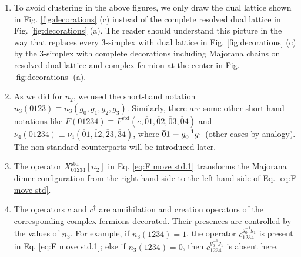 \documentclass[%
 reprint,
 amsmath,amssymb,
 aps,
prb,
]{revtex4-2}
\begin{document}
\begin{enumerate}
\item To avoid clustering in the above figures, we only draw the dual lattice shown in Fig. \ref{fig:decorations} (c) instead of the complete resolved dual lattice in Fig. \ref{fig:decorations} (a).
The reader should understand this picture in the way that replaces every 3-simplex with dual lattice in Fig. \ref{fig:decorations} (c) by the 3-simplex with complete decorations including Majorana chains on resolved dual lattice and complex fermion at the center in Fig. \ref{fig:decorations} (a).
\item As we did for $n_2$, we used the short-hand notation $n_{3} (0123) \equiv n_{3} (g_0, g_1, g_2, g_3)$.
Similarly, there are some other short-hand notations like $F(01234) \equiv F^{\mathrm{std}}( e,\overline{0} 1,\overline{0} 2,\overline{0} 3,\overline{0} 4)$ and $\nu_4(01234) \equiv \nu _{4}(\overline{0} 1,\overline{1} 2,\overline{2} 3,\overline{3} 4)$, where $\Bar{0}1 \equiv g_0^{-1} g_1$ (other cases by analogy).
The non-standard counterparts will be introduced later.
\item The operator $X_{01234}^{\mathrm{std}}[ n_{2}]$ in Eq. \eqref{eq:F move std.1} transforms the Majorana dimer configuration from the right-hand side to the left-hand side of Eq. \eqref{eq:F move std}.
\item The operators $c$ and $c^\dagger$ are annihilation and creation operators of the corresponding complex fermions decorated.
Their presences are controlled by the values of $n_3$.
For example, if $n_3(1234)=1$, the operator $c_{1234}^{g_{0}^{-1} g_{1}}$ is present in Eq. \eqref{eq:F move std.1}; else if $n_3(1234)=0$, then $c_{1234}^{g_{0}^{-1} g_{1}}$ is absent here.
\end{enumerate}
\end{document}
